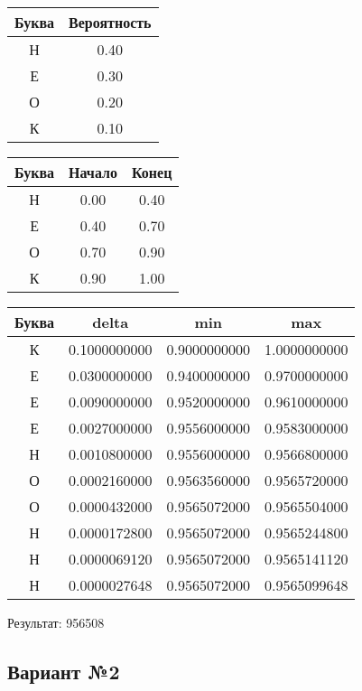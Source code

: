 \documentclass[a4paper, 12pt]{article}
\begin{document}
\begin{center}
 \begin{tabular}{ |c|c| } 
  \hline
     Буква & Вероятность \\ \hline
Н & 0.40\\\hline
Е & 0.30\\\hline
О & 0.20\\\hline
К & 0.10
\\ \hline \end{tabular}
\end{center}
\begin{center}
 \begin{tabular}{ |c|c|c| } 
  \hline
     Буква & Начало & Конец \\ \hline
Н & 0.00 & 0.40\\\hline
Е & 0.40 & 0.70\\\hline
О & 0.70 & 0.90\\\hline
К & 0.90 & 1.00
\\ \hline \end{tabular}
\end{center}
\begin{center}
 \begin{tabular}{ |c|c|c|c| } 
  \hline
     Буква & delta & min & max \\ \hline
К & 0.1000000000 & 0.9000000000 & 1.0000000000\\\hline
Е & 0.0300000000 & 0.9400000000 & 0.9700000000\\\hline
Е & 0.0090000000 & 0.9520000000 & 0.9610000000\\\hline
Е & 0.0027000000 & 0.9556000000 & 0.9583000000\\\hline
Н & 0.0010800000 & 0.9556000000 & 0.9566800000\\\hline
О & 0.0002160000 & 0.9563560000 & 0.9565720000\\\hline
О & 0.0000432000 & 0.9565072000 & 0.9565504000\\\hline
Н & 0.0000172800 & 0.9565072000 & 0.9565244800\\\hline
Н & 0.0000069120 & 0.9565072000 & 0.9565141120\\\hline
Н & 0.0000027648 & 0.9565072000 & 0.9565099648
\\ \hline \end{tabular}
\end{center}
Результат: 956508
\pagebreak
\subsection{Вариант №2}
\end{document}
